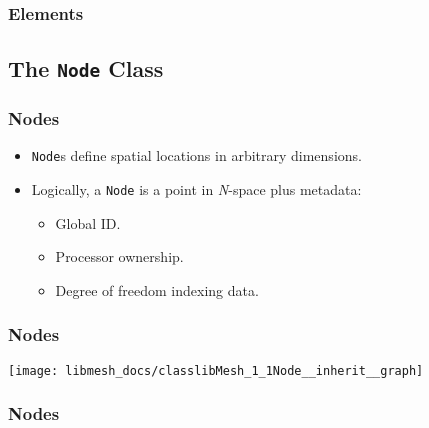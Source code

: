 \begin{frame}[shrink]
  \frametitle{Elements}
  
\end{frame}

 

\subsection{The \texttt{Node} Class}
\begin{frame}
  \frametitle{Nodes}
  \begin{block}{}
    \begin{itemize}
      \item \texttt{Node}s define spatial locations in arbitrary dimensions.
      \item Logically, a \texttt{Node} is a point in \emph{N}-space plus metadata:
        \begin{itemize}
          \item Global ID.
          \item Processor ownership.
          \item Degree of freedom indexing data.
        \end{itemize}
    \end{itemize}
  \end{block}
\end{frame}

\begin{frame}
  \frametitle{Nodes}
  \begin{center}
    \texttt{[image: libmesh\_docs/classlibMesh\_1\_1Node\_\_inherit\_\_graph]}
  \end{center}
\end{frame}

\begin{frame}
  \frametitle{Nodes}
  
\end{frame}

